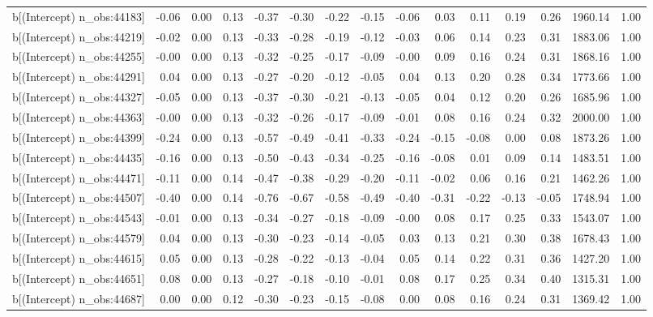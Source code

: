 \begin{table}[ht]
\begin{tabular}{rrrrrrrrrrrrrrr}
  b[(Intercept) n\_obs:44183] & -0.06 & 0.00 & 0.13 & -0.37 & -0.30 & -0.22 & -0.15 & -0.06 & 0.03 & 0.11 & 0.19 & 0.26 & 1960.14 & 1.00 \\ 
  b[(Intercept) n\_obs:44219] & -0.02 & 0.00 & 0.13 & -0.33 & -0.28 & -0.19 & -0.12 & -0.03 & 0.06 & 0.14 & 0.23 & 0.31 & 1883.06 & 1.00 \\ 
  b[(Intercept) n\_obs:44255] & -0.00 & 0.00 & 0.13 & -0.32 & -0.25 & -0.17 & -0.09 & -0.00 & 0.09 & 0.16 & 0.24 & 0.31 & 1868.16 & 1.00 \\ 
  b[(Intercept) n\_obs:44291] & 0.04 & 0.00 & 0.13 & -0.27 & -0.20 & -0.12 & -0.05 & 0.04 & 0.13 & 0.20 & 0.28 & 0.34 & 1773.66 & 1.00 \\ 
  b[(Intercept) n\_obs:44327] & -0.05 & 0.00 & 0.13 & -0.37 & -0.30 & -0.21 & -0.13 & -0.05 & 0.04 & 0.12 & 0.20 & 0.26 & 1685.96 & 1.00 \\ 
  b[(Intercept) n\_obs:44363] & -0.00 & 0.00 & 0.13 & -0.32 & -0.26 & -0.17 & -0.09 & -0.01 & 0.08 & 0.16 & 0.24 & 0.32 & 2000.00 & 1.00 \\ 
  b[(Intercept) n\_obs:44399] & -0.24 & 0.00 & 0.13 & -0.57 & -0.49 & -0.41 & -0.33 & -0.24 & -0.15 & -0.08 & 0.00 & 0.08 & 1873.26 & 1.00 \\ 
  b[(Intercept) n\_obs:44435] & -0.16 & 0.00 & 0.13 & -0.50 & -0.43 & -0.34 & -0.25 & -0.16 & -0.08 & 0.01 & 0.09 & 0.14 & 1483.51 & 1.00 \\ 
  b[(Intercept) n\_obs:44471] & -0.11 & 0.00 & 0.14 & -0.47 & -0.38 & -0.29 & -0.20 & -0.11 & -0.02 & 0.06 & 0.16 & 0.21 & 1462.26 & 1.00 \\ 
  b[(Intercept) n\_obs:44507] & -0.40 & 0.00 & 0.14 & -0.76 & -0.67 & -0.58 & -0.49 & -0.40 & -0.31 & -0.22 & -0.13 & -0.05 & 1748.94 & 1.00 \\ 
  b[(Intercept) n\_obs:44543] & -0.01 & 0.00 & 0.13 & -0.34 & -0.27 & -0.18 & -0.09 & -0.00 & 0.08 & 0.17 & 0.25 & 0.33 & 1543.07 & 1.00 \\ 
  b[(Intercept) n\_obs:44579] & 0.04 & 0.00 & 0.13 & -0.30 & -0.23 & -0.14 & -0.05 & 0.03 & 0.13 & 0.21 & 0.30 & 0.38 & 1678.43 & 1.00 \\ 
  b[(Intercept) n\_obs:44615] & 0.05 & 0.00 & 0.13 & -0.28 & -0.22 & -0.13 & -0.04 & 0.05 & 0.14 & 0.22 & 0.31 & 0.36 & 1427.20 & 1.00 \\ 
  b[(Intercept) n\_obs:44651] & 0.08 & 0.00 & 0.13 & -0.27 & -0.18 & -0.10 & -0.01 & 0.08 & 0.17 & 0.25 & 0.34 & 0.40 & 1315.31 & 1.00 \\ 
  b[(Intercept) n\_obs:44687] & 0.00 & 0.00 & 0.12 & -0.30 & -0.23 & -0.15 & -0.08 & 0.00 & 0.08 & 0.16 & 0.24 & 0.31 & 1369.42 & 1.00 \\ 

\end{tabular}
\end{table}
